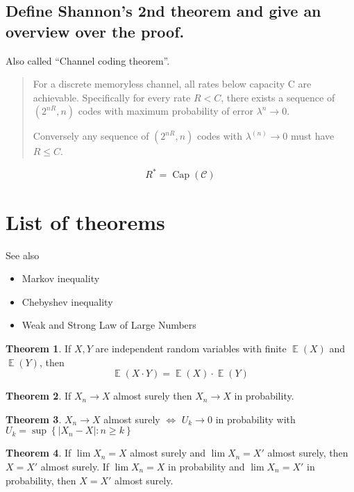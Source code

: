 \documentclass[a4paper]{article}
\newcommand\set[1]{\left\{#1\right\}}
\newcommand\card[1]{\left|#1\right|}
\DeclareMathOperator{\Capacity}{Cap}
\DeclareMathOperator{\Ex}{\mathbb{E}}
\theoremstyle{definition}
\newtheorem{thm}{Theorem}
\begin{document}
\subsection{Define Shannon's 2nd theorem and give an overview over the proof.}

Also called ``Channel coding theorem''.

\begin{quote}
  For a discrete memoryless channel, all rates below capacity C are achievable.
  Specifically for every rate $R < C$, there exists a sequence of $(2^{nR}, n)$ codes with maximum probability of error $\lambda^n \to 0$.

  Conversely any sequence of $(2^{nR}, n)$ codes with $\lambda^{(n)} \to 0$ must have $R \leq C$.
\end{quote}

\[ R^* = \Capacity(\mathcal{C}) \]

\section{List of theorems}

See also
\begin{itemize}
  \item Markov inequality
  \item Chebyshev inequality
  \item Weak and Strong Law of Large Numbers
\end{itemize}

\begin{thm}
  If $X,Y$ are independent random variables with finite $\Ex(X)$ and $\Ex(Y)$, then
  \[ \Ex(X\cdot Y) = \Ex(X) \cdot \Ex(Y) \]
\end{thm}

\begin{thm}
  If $X_n \rightarrow X$ almost surely then $X_n \rightarrow X$ in probability.
\end{thm}

\begin{thm}
  $X_n \rightarrow X$ almost surely $\Leftrightarrow$ $U_k \rightarrow 0$ in probability with
  $ U_k = \sup\set{\card{X_n - X}: n \geq k} $
\end{thm}

\begin{thm}
  If $\lim X_n = X$ almost surely and $\lim X_n = X'$ almost surely, then $X = X'$ almost surely.
  If $\lim X_n = X$ in probability and $\lim X_n = X'$ in probability, then $X = X'$ almost surely.
\end{thm}
\end{document}
